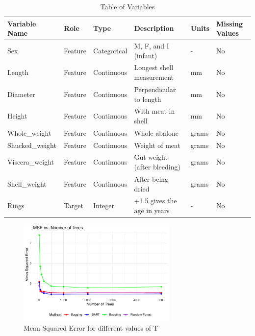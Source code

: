 \documentclass[a4paper,11pt]{article}
\begin{document}
\begin{table}[]
  \centering
  \begin{tabular}{llllll}

  \toprule
  Variable Name & Role & Type & Description & Units & Missing Values\\  
  \midrule
   Sex                  & Feature       & Categorical   & M, F, and I (infant) & -             & No                      \\   Length               & Feature       & Continuous    & Longest shell measurement & mm         & No                      \\   Diameter             & Feature       & Continuous    & Perpendicular to length & mm           & No                      \\   Height               & Feature       & Continuous    & With meat in shell      & mm           & No                      \\   Whole\_weight         & Feature       & Continuous    & Whole abalone           & grams        & No                      \\   Shucked\_weight       & Feature       & Continuous    & Weight of meat          & grams        & No                      \\   Viscera\_weight       & Feature       & Continuous    & Gut weight (after bleeding) & grams    & No                      \\   Shell\_weight         & Feature       & Continuous    & After being dried       & grams        & No                      \\   Rings                & Target        & Integer       & +1.5 gives the age in years & -          & No                      \\
   \bottomrule
  \end{tabular}
  \caption{Table of Variables}
  \label{table1}
  \end{table}

\begin{figure}
  \centering
  \includegraphics[width=0.7\textwidth]{../outputs/mse_plot.pdf}
  \caption{Mean Squared Error for different values of T}
  \label{plot_mse}
\end{figure}
\end{document}
